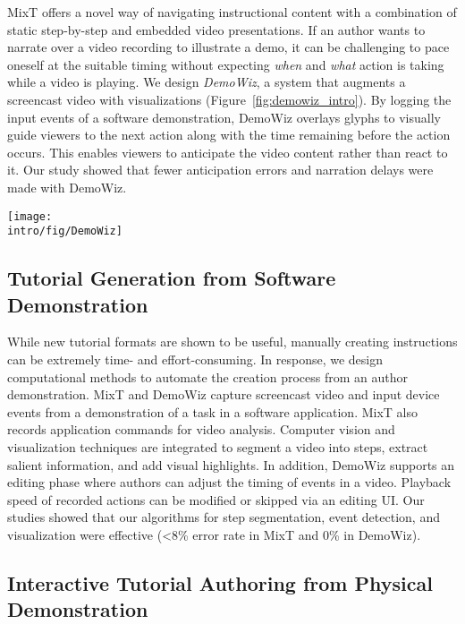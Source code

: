 MixT offers a novel way of navigating instructional content with a combination of static step-by-step and embedded video presentations. If an author wants to narrate over a video recording to illustrate a demo, it can be challenging to pace oneself at the suitable timing without expecting \emph{when} and \emph{what} action is taking while a video is playing.
%
We design \emph{DemoWiz}, a system that augments a screencast video with visualizations (Figure~\ref{fig:demowiz_intro}). By logging the input events of a software demonstration, DemoWiz overlays glyphs to visually guide viewers to the next action along with the time remaining before the action occurs. This enables viewers to anticipate the video content rather than react to it.
%
Our study showed that fewer anticipation errors and narration delays were made with DemoWiz.

\begin{figure*}[t]
\centering
\texttt{[image: \\intro/fig/DemoWiz]}
\caption{DemoWiz visualizes input events in a screencast video to help viewers anticipate the upcoming event for following a software demonstration.}
\label{fig:demowiz_intro}
\end{figure*}

\subsection{Tutorial Generation from Software Demonstration}

While new tutorial formats are shown to be useful, manually creating instructions can be extremely time- and effort-consuming. In response, we design computational methods to automate the creation process from an author demonstration. MixT and DemoWiz capture screencast video and input device events from a demonstration of a task in a software application. MixT also records application commands for video analysis. Computer vision and visualization techniques are integrated to segment a video into steps, extract salient information, and add visual highlights.
%
In addition, DemoWiz supports an editing phase where authors can adjust the timing of events in a video. Playback speed of recorded actions can be modified or skipped via an editing UI. Our studies showed that our algorithms for step segmentation, event detection, and visualization were effective (\textless8\% error rate in MixT and 0\% in DemoWiz).

\subsection{Interactive Tutorial Authoring from Physical Demonstration}

